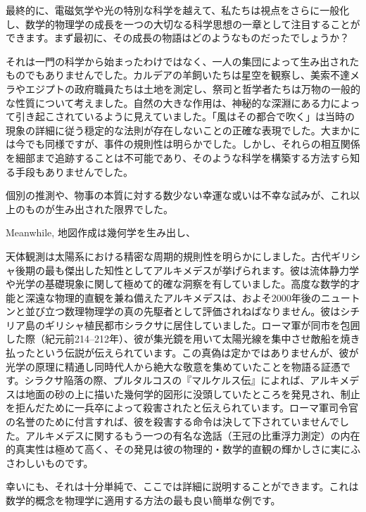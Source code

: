 \documentclass[a4paper,11pt,openany]{ltjsbook}
\begin{document}
最終的に、電磁気学や光の特別な科学を越えて、私たちは視点をさらに一般化し、数学的物理学の成長を一つの大切なる科学思想の一章として注目することができます。まず最初に、その成長の物語はどのようなものだったでしょうか？

それは一門の科学から始まったわけではなく、一人の集団によって生み出されたものでもありませんでした。カルデアの羊飼いたちは星空を観察し、美索不達メラやエジプトの政府職員たちは土地を測定し、祭司と哲学者たちは万物の一般的な性質について考えました。自然の大きな作用は、神秘的な深淵にある力によって引き起こされているように見えていました。「風はその都合で吹く」は当時の現象の詳細に従う穏定的な法則が存在しないことの正確な表現でした。大まかには今でも同様ですが、事件の規則性は明らかでした。しかし、それらの相互関係を細部まで追跡することは不可能であり、そのような科学を構築する方法すら知る手段もありませんでした。

個別の推測や、物事の本質に対する数少ない幸運な或いは不幸な試みが、これ以上のものが生み出された限界でした。

Meanwhile, 地図作成は幾何学を生み出し、

天体観測は太陽系における精密な周期的規則性を明らかにしました。古代ギリシャ後期の最も傑出した知性としてアルキメデスが挙げられます。彼は流体静力学や光学の基礎現象に関して極めて的確な洞察を有していました。高度な数学的才能と深遠な物理的直観を兼ね備えたアルキメデスは、およそ2000年後のニュートンと並び立つ数理物理学の真の先駆者として評価されねばなりません。彼はシチリア島のギリシャ植民都市シラクサに居住していました。ローマ軍が同市を包囲した際（紀元前214--212年）、彼が集光鏡を用いて太陽光線を集中させ敵船を焼き払ったという伝説が伝えられています。この真偽は定かではありませんが、彼が光学の原理に精通し同時代人から絶大な敬意を集めていたことを物語る証憑です。シラクサ陥落の際、プルタルコスの『マルケルス伝』によれば、アルキメデスは地面の砂の上に描いた幾何学的図形に没頭していたところを発見され、制止を拒んだために一兵卒によって殺害されたと伝えられています。ローマ軍司令官の名誉のために付言すれば、彼を殺害する命令は決して下されていませんでした。アルキメデスに関するもう一つの有名な逸話（王冠の比重浮力測定）の内在的真実性は極めて高く、その発見は彼の物理的・数学的直観の輝かしさに実にふさわしいものです。






幸いにも、それは十分単純で、ここでは詳細に説明することができます。これは数学的概念を物理学に適用する方法の最も良い簡単な例です。
\end{document}
